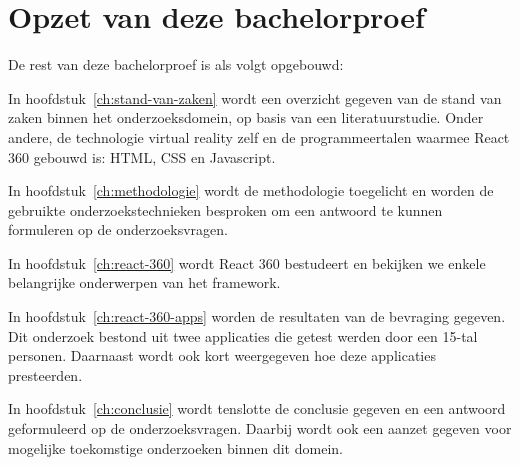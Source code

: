 \section{Opzet van deze bachelorproef}
\label{sec:opzet-bachelorproef}


De rest van deze bachelorproef is als volgt opgebouwd:

In hoofdstuk~\ref{ch:stand-van-zaken} wordt een overzicht gegeven van de stand van zaken binnen het onderzoeksdomein, op basis van een literatuurstudie. Onder andere, de technologie virtual reality zelf en de programmeertalen waarmee React 360 gebouwd is: HTML, CSS en Javascript.

In hoofdstuk~\ref{ch:methodologie} wordt de methodologie toegelicht en worden de gebruikte onderzoekstechnieken besproken om een antwoord te kunnen formuleren op de onderzoeksvragen.

In hoofdstuk~\ref{ch:react-360} wordt React 360 bestudeert en bekijken we enkele belangrijke onderwerpen van het framework.

In hoofdstuk~\ref{ch:react-360-apps} worden de resultaten van de bevraging gegeven. Dit onderzoek bestond uit twee applicaties die getest werden door een 15-tal personen. Daarnaast wordt ook kort weergegeven hoe deze applicaties presteerden.

In hoofdstuk~\ref{ch:conclusie} wordt tenslotte de conclusie gegeven en een antwoord geformuleerd op de onderzoeksvragen. Daarbij wordt ook een aanzet gegeven voor mogelijke toekomstige onderzoeken binnen dit domein.

